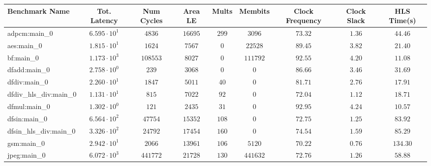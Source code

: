 \begin{tabular}{|l|c|c|c|c|c|c|c|c|}
\hline
Benchmark Name          & Tot. Latency           & Num Cycles & Area LE    & Mults   & Membits    & Clock Frequency & Clock Slack & HLS Time(s) \\
\hline
adpcm:main\_0           & $ 6.595 \cdot 10^{1} $ & $ 4836   $ & $ 16695  $ & $ 299 $ & $ 3096   $ & $ 73.32       $ & $ 1.36    $ & $ 44.46   $ \\
aes:main\_0             & $ 1.815 \cdot 10^{1} $ & $ 1624   $ & $ 7567   $ & $ 0   $ & $ 22528  $ & $ 89.45       $ & $ 3.82    $ & $ 21.40   $ \\
bf:main\_0              & $ 1.173 \cdot 10^{3} $ & $ 108553 $ & $ 8027   $ & $ 0   $ & $ 111792 $ & $ 92.55       $ & $ 4.20    $ & $ 11.08   $ \\
dfadd:main\_0           & $ 2.758 \cdot 10^{0} $ & $ 239    $ & $ 3068   $ & $ 0   $ & $ 0      $ & $ 86.66       $ & $ 3.46    $ & $ 31.69   $ \\
dfdiv:main\_0           & $ 2.260 \cdot 10^{1} $ & $ 1847   $ & $ 5011   $ & $ 40  $ & $ 0      $ & $ 81.71       $ & $ 2.76    $ & $ 17.91   $ \\
dfdiv\_hls\_div:main\_0 & $ 1.131 \cdot 10^{1} $ & $ 815    $ & $ 7022   $ & $ 92  $ & $ 0      $ & $ 72.04       $ & $ 1.12    $ & $ 18.71   $ \\
dfmul:main\_0           & $ 1.302 \cdot 10^{0} $ & $ 121    $ & $ 2435   $ & $ 31  $ & $ 0      $ & $ 92.95       $ & $ 4.24    $ & $ 10.57   $ \\
dfsin:main\_0           & $ 6.564 \cdot 10^{2} $ & $ 47754  $ & $ 15352  $ & $ 108 $ & $ 0      $ & $ 72.75       $ & $ 1.25    $ & $ 83.92   $ \\
dfsin\_hls\_div:main\_0 & $ 3.326 \cdot 10^{2} $ & $ 24792  $ & $ 17454  $ & $ 160 $ & $ 0      $ & $ 74.54       $ & $ 1.59    $ & $ 85.29   $ \\
gsm:main\_0             & $ 2.942 \cdot 10^{1} $ & $ 2066   $ & $ 13961  $ & $ 106 $ & $ 5120   $ & $ 70.22       $ & $ 0.76    $ & $ 134.30  $ \\
jpeg:main\_0            & $ 6.072 \cdot 10^{3} $ & $ 441772 $ & $ 21728  $ & $ 130 $ & $ 441632 $ & $ 72.76       $ & $ 1.26    $ & $ 58.88   $ \\

\end{tabular}
